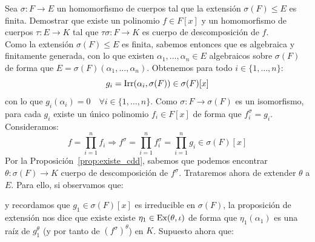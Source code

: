 \begin{ejercicio}
    Sea $\sigma:F\to E$ un homomorfismo de cuerpos tal que la extensión $\sigma(F)\leq E$ es finita. Demostrar que existe un polinomio $f\in F[x]$ y un homomorfismo de cuerpos $\tau:E\to K$ tal que $\tau\sigma:F\to K$ es cuerpo de descomposición de $f$.\\

    \noindent
    Como la extensión $\sigma(F)\leq E$ es finita, sabemos entonces que es algebraica y finitamente generada, con lo que existen $\alpha_1, \ldots, \alpha_n\in E$ algebraicos sobre $\sigma(F)$ de forma que $E = \sigma(F)(\alpha_1, \ldots, \alpha_n)$. Obtenemos para todo $i \in \{1,\ldots,n\}$:
    \begin{equation*}
        g_i = \operatorname{Irr}(\alpha_i, \sigma(F))\in \sigma(F)[x]
    \end{equation*}
    con lo que $g_i(\alpha_i)=0\quad \forall i \in \{1,\ldots,n\}$. Como $\sigma:F\to\sigma(F)$ es un isomorfismo, para cada $g_i$ existe un único polinomio $f_i \in F[x]$ de forma que $f_i^\sigma=g_i$. Consideramos:
    \begin{equation*}
        f = \prod_{i=1}^{n} f_i \Longrightarrow f^\sigma =\prod_{i=1}^{n}f_i^\sigma= \prod_{i=1}^{n}g_i \in \sigma(F)[x]
    \end{equation*}
    Por la Proposición~\ref{prop:existe_cdd}, sabemos que podemos encontrar $\theta:\sigma(F)\to K$ cuerpo de descomposición de $f^{\sigma}$. Trataremos ahora de extender $\theta$ a $E$. Para ello, si observamos que:
    \begin{figure}[H]
        \centering
    \end{figure}
    \noindent
    y recordamos que $g_1\in \sigma(F)[x]$ es irreducible en $\sigma(F)$, la proposición de extensión nos dice que existe existe $\eta_1 \in \operatorname{Ex}(\theta,\iota)$ de forma que $\eta_1(\alpha_1)$ es una raíz de $g_1^\theta$ (y por tanto de ${(f^\sigma)}^{\theta}$) en $K$. Supuesto ahora que:
    \begin{figure}[H]
        \centering
\end{figure}
\end{ejercicio}
